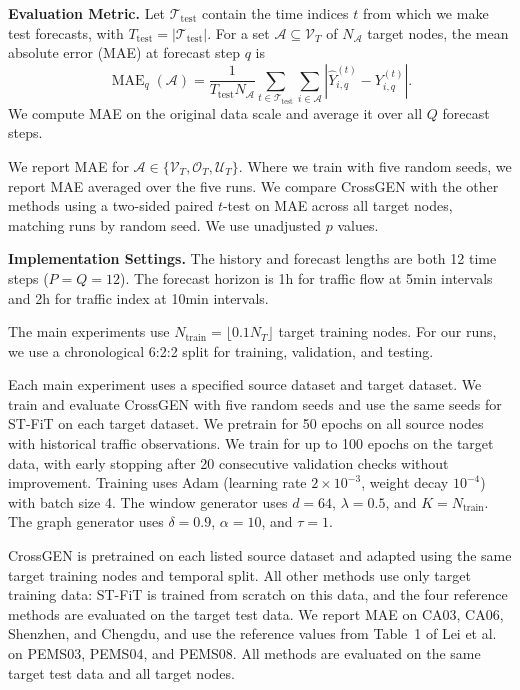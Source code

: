 \documentclass[runningheads,a4paper]{llncs}
\begin{document}
\begingroup
\DeclareRobustCommand{\evaluationmetrics}{%
\begin{samepage}
  \textbf{Evaluation Metric.} Let $\mathcal T_{\mathrm{test}}$ contain the time indices $t$ from which we make test forecasts, with $T_{\mathrm{test}}=|\mathcal T_{\mathrm{test}}|$. For a set $\mathcal A\subseteq\mathcal V_T$ of $N_{\mathcal A}$ target nodes, the mean absolute error (MAE) at forecast step $q$ is
\[
  \operatorname{MAE}_{q}(\mathcal A)
  = \frac{1}{T_{\mathrm{test}}N_{\mathcal A}}
    \sum_{t\in\mathcal T_{\mathrm{test}}}\sum_{i\in\mathcal A}
    \left|\widehat Y_{i,q}^{(t)}-Y_{i,q}^{(t)}\right|.
\]
We compute MAE on the original data scale and average it over all $Q$ forecast steps.
\end{samepage}
We report MAE for $\mathcal A\in\{\mathcal V_T,\mathcal O_T,\mathcal U_T\}$.
Where we train with five random seeds, we report MAE averaged over the five runs. We compare CrossGEN with the other methods using a two-sided paired $t$-test on MAE across all target nodes, matching runs by random seed. We use unadjusted $p$ values.
}
\noindent\evaluationmetrics
\endgroup

\noindent\textbf{Implementation Settings.}
The history and forecast lengths are both 12 time steps ($P=Q=12$). The forecast horizon is 1h for traffic flow at 5min intervals and 2h for traffic index at 10min intervals.

The main experiments use $N_{\mathrm{train}}=\lfloor 0.1 N_T\rfloor$ target training nodes.
For our runs, we use a chronological 6:2:2 split for training, validation, and testing.




Each main experiment uses a specified source dataset and target dataset. We train and evaluate CrossGEN with five random seeds and use the same seeds for ST-FiT on each target dataset.
We pretrain for 50 epochs on all source nodes with historical traffic observations.
We train for up to 100 epochs on the target data, with early stopping after 20 consecutive validation checks without improvement.
Training uses Adam (learning rate $2\times10^{-3}$, weight decay $10^{-4}$) with batch size 4.
The window generator uses $d=64$, $\lambda=0.5$, and $K=N_{\mathrm{train}}$. The graph generator uses $\delta=0.9$, $\alpha=10$, and $\tau=1$.





CrossGEN is pretrained on each listed source dataset and adapted using the same target training nodes and temporal split. All other methods use only target training data: ST-FiT is trained from scratch on this data, and the four reference methods are evaluated on the target test data. We report MAE on CA03, CA06, Shenzhen, and Chengdu, and use the reference values from Table~1 of Lei et al.~\cite{stfit} on PEMS03, PEMS04, and PEMS08. All methods are evaluated on the same target test data and all target nodes.
\end{document}
